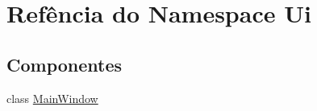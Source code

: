 \hypertarget{namespace_ui}{}\section{Refência do Namespace Ui}
\label{namespace_ui}
\subsection*{Componentes}
\begin{DoxyCompactItemize}
\item 
class \mbox{\hyperlink{class_ui_1_1_main_window}{Main\+Window}}
\end{DoxyCompactItemize}
